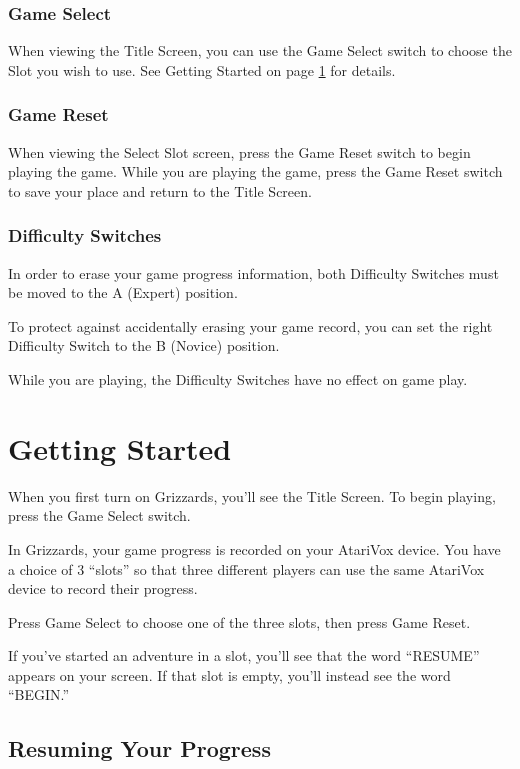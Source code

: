 \documentclass[10pt,twoside,openright]{memoir}
\begin{document}
\subsection{Game Select}

When viewing the Title Screen, you can use the Game Select switch to
choose the Slot you wish to use.  See Getting Started on page
\ref{Getting Started} for details.

\subsection{Game Reset}

When viewing  the Select  Slot screen,  press the  Game Reset  switch to
begin playing the  game. While you are playing the  game, press the Game
Reset switch to save your place and return to the Title Screen.

\subsection{Difficulty Switches}

In order to erase your game progress information, both Difficulty
Switches must be moved to the A (Expert) position.

To protect  against accidentally erasing  your game record, you  can set
the right Difficulty Switch to the B (Novice) position.

While  you  are playing,  the  Difficulty  Switches  have no  effect  on
game play. 

\chapter{Getting Started}\label{Getting Started}

When you first turn on Grizzards, you'll see the Title
Screen. To begin playing, press the Game Select switch.

In  Grizzards,  your game  progress is  recorded on  your
AtariVox  device. You  have  a choice  of 3  ``slots''  so that  three
different players  can use  the same AtariVox  device to  record their
progress.

Press Game Select to choose one of the three slots, then press Game
Reset.

If you've started an adventure in a slot, you'll see that the word
``RESUME'' appears on your screen. If that slot is empty, you'll
instead see the word ``BEGIN.''

\section{Resuming Your Progress}
\end{document}
